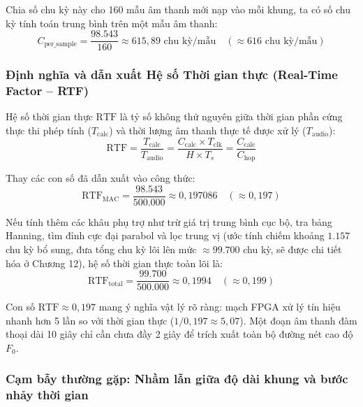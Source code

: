 Chia số chu kỳ này cho 160 mẫu âm thanh mới nạp vào mỗi khung, ta có số chu kỳ tính toán trung bình trên một mẫu âm thanh:
\begin{equation}
C_{\text{per\_sample}} = \frac{98.543}{160} \approx 615{,}89\text{ chu kỳ/mẫu} \quad (\approx 616\text{ chu kỳ/mẫu})
\end{equation}

\subsubsection*{Định nghĩa và dẫn xuất Hệ số Thời gian thực (Real-Time Factor -- RTF)}
Hệ số thời gian thực $\text{RTF}$ là tỷ số không thứ nguyên giữa thời gian phần cứng thực thi phép tính ($T_{\text{calc}}$) và thời lượng âm thanh thực tế được xử lý ($T_{\text{audio}}$):
\begin{equation}
\text{RTF} = \frac{T_{\text{calc}}}{T_{\text{audio}}} = \frac{C_{\text{calc}} \times T_{\text{clk}}}{H \times T_s} = \frac{C_{\text{calc}}}{C_{\text{hop}}}
\end{equation}

Thay các con số đã dẫn xuất vào công thức:
\begin{equation}
\text{RTF}_{\text{MAC}} = \frac{98.543}{500.000} \approx 0{,}197086 \quad (\approx 0{,}197)
\end{equation}

Nếu tính thêm các khâu phụ trợ như trừ giá trị trung bình cục bộ, tra bảng Hanning, tìm đỉnh cực đại parabol và lọc trung vị (ước tính chiếm khoảng $1.157$ chu kỳ bổ sung, đưa tổng chu kỳ lõi lên mức $\approx 99.700$ chu kỳ, sẽ được chi tiết hóa ở Chương 12), hệ số thời gian thực toàn lõi là:
\begin{equation}
\text{RTF}_{\text{total}} = \frac{99.700}{500.000} \approx 0{,}1994 \quad (\approx 0{,}199)
\end{equation}

Con số $\text{RTF} \approx 0{,}197$ mang ý nghĩa vật lý rõ ràng: mạch FPGA xử lý tín hiệu nhanh hơn 5 lần so với thời gian thực ($1 / 0{,}197 \approx 5{,}07$). Một đoạn âm thanh đàm thoại dài 10 giây chỉ cần chưa đầy 2 giây để trích xuất toàn bộ đường nét cao độ $F_0$.

\subsubsection*{Cạm bẫy thường gặp: Nhầm lẫn giữa độ dài khung và bước nhảy thời gian}

